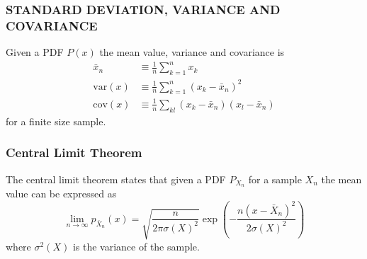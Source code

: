 \documentclass[a4paper, hidelinks, 10pt]{article}
\newcommand{\rarr}{\rightarrow} %
\newcommand{\suml}[2]{\sum\limits_{#1=1}^{#2}}
\begin{document}
\subsubsection{STANDARD DEVIATION, VARIANCE AND COVARIANCE}
\label{ssub:standard_deviation__variance_and_covariance}
    Given a PDF $P(x)$ the mean value, variance and covariance is
        \begin{align}
            \bar{x}_n &\equiv \frac{1}{n}\suml{k}{n} x_k \\
            \text{var}(x) &\equiv
            \frac{1}{n}\suml{k}{n}\left(x_k-\bar{x}_n\right)^2 \\
            \text{cov}(x) &\equiv \frac{1}{n}\sum\limits_{kl}
            \left(x_k-\bar{x}_n\right)\left(x_l-\bar{x}_n\right)
            \label{eq:statfinite}
        \end{align}
    for a finite size sample.

\subsubsection{Central Limit Theorem}
\label{ssub:central_limit_theorem}
    The central limit theorem states that given a PDF $P_{X_n}$ for a sample $X_n$
    the mean value can be expressed as
        \begin{equation}
            \lim\limits_{n\rarr\infty}p_{\bar{X}_n}(x) =
            \sqrt{\frac{n}{2\pi\sigma(X)^2}}
            \exp(-\frac{n(x-\bar{X}_n)^2}{2\sigma(X)^2})
            \label{eq:centrallimit}
        \end{equation}
    where $\sigma^2(X)$ is the variance of the sample.
\end{document}
